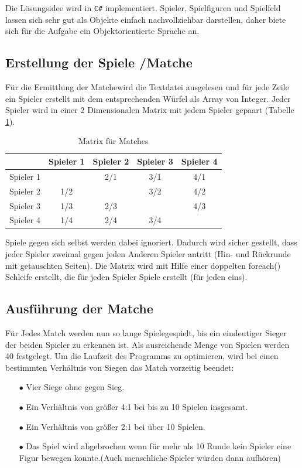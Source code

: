 \documentclass[a4paper,11pt,ngerman]{scrartcl}
\begin{document}
Die Lösungsidee wird in \texttt{C\#} implementiert. Spieler, Spielfiguren und Spielfeld lassen sich sehr gut als Objekte einfach nachvollziehbar darstellen, daher biete sich für die Aufgabe ein Objektorientierte Sprache an.
\subsection{Erstellung der Spiele /\glqq Matche\grqq} 
Für die Ermittlung der \glqq Matche\grqq wird die Textdatei ausgelesen und für jede Zeile ein Spieler erstellt mit dem entsprechenden Würfel als Array von Integer. Jeder Spieler wird in einer 2 Dimensionalen Matrix mit jedem Spieler gepaart (Tabelle \ref{table:Matrix}).
\begin{table}	
	\centering
	\begin{tabular}{|c|c|c|c|c|}	
		\hline
		& Spieler 1 & Spieler 2 & Spieler 3 & Spieler 4\\
		\hline
		Spieler 1 &\cellcolor{mygray}& 2/1 & 3/1 & 4/1 \\	
		\hline
		Spieler 2 & 1/2 & \cellcolor{mygray} & 3/2 & 4/2 \\
		\hline
		Spieler 3 & 1/3 & 2/3 &\cellcolor{mygray}& 4/3 \\
		\hline
		Spieler 4 & 1/4 & 2/4 & 3/4 & \cellcolor{mygray} \\
		\hline
	\end{tabular}
	\caption{Matrix für Matches}
	\label{table:Matrix}
\end{table}
Spiele gegen sich selbst werden dabei ignoriert. Dadurch wird sicher gestellt, dass jeder Spieler zweimal gegen jeden Anderen Spieler antritt (Hin- und Rückrunde mit getauschten Seiten). Die Matrix wird mit Hilfe einer doppelten foreach() Schleife erstellt, die für jeden Spieler Spiele erstellt (für jeden eins).
\subsection{Ausführung der \glqq Matche\grqq}
Für Jedes Match werden nun so lange \glqq Spiele\grqq \space gespielt, bis ein eindeutiger Sieger der beiden Spieler zu erkennen ist. Als ausreichende Menge von Spielen werden 40 festgelegt. Um die Laufzeit des Programms zu optimieren, wird bei einen bestimmten Verhältnis von Siegen das Match vorzeitig beendet:
\begin{enumerate}
	\item[$\bullet$] Vier Siege ohne gegen Sieg.	
	\item[$\bullet$] Ein Verhältnis von größer 4:1 bei bis zu 10 Spielen insgesamt.
	\item[$\bullet$] Ein Verhältnis von größer 2:1 bei über 10 Spielen. 
	\item[$\bullet$] Das Spiel wird abgebrochen wenn für mehr als 10 Runde kein Spieler eine Figur bewegen konnte.(Auch menschliche Spieler würden dann aufhören)
\end{enumerate}
\end{document}
